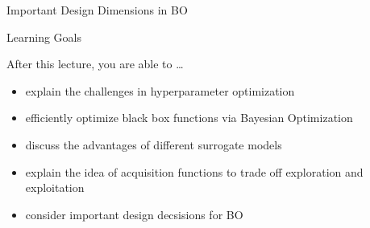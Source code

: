 {\begin{frame}[c,fragile]{Important Design Dimensions in BO}
\end{frame}
}
\begin{frame}[c]{Learning Goals}

After this lecture, you are able to \ldots

\begin{itemize}
	\item explain the \alert{challenges in hyperparameter optimization}
	\item efficiently optimize black box functions via \alert{Bayesian Optimization}
	\item discuss the advantages of different \alert{surrogate models}
	\item explain the idea of \alert{acquisition functions} to trade off exploration and exploitation
	\item consider important design decsisions for BO
\end{itemize}
\end{frame}

